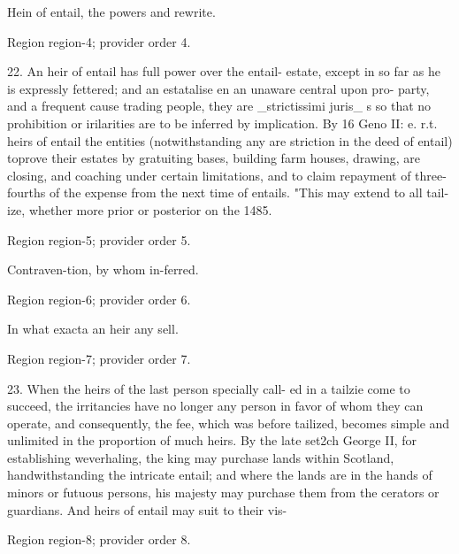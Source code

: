 \documentclass[11pt]{article}
\begin{document}
Hein of entail, the powers and rewrite.
\par

{\scriptsize\color{gray} Region region-4; provider order 4.\par}
\medskip

22. An heir of entail has full power over the entail- estate, except in so far as he is expressly fettered; and an estatalise en an unaware central upon pro- party, and a frequent cause trading people, they are \_strictissimi juris\_ s so that no prohibition or irilarities are to be inferred by implication. By 16 Geno II: e. r.t. heirs of entail the entities (notwithstanding any are striction in the deed of entail) toprove their estates by gratuiting bases, building farm houses, drawing, are closing, and coaching under certain limitations, and to claim repayment of three-fourths of the expense from the next time of entails. "This may extend to all tail-ize, whether more prior or posterior on the 1485.
\par

{\scriptsize\color{gray} Region region-5; provider order 5.\par}
\medskip

Contraven-tion, by whom in-ferred.
\par

{\scriptsize\color{gray} Region region-6; provider order 6.\par}
\medskip

In what exacta an heir any sell.
\par

{\scriptsize\color{gray} Region region-7; provider order 7.\par}
\medskip

23. When the heirs of the last person specially call- ed in a tailzie come to succeed, the irritancies have no longer any person in favor of whom they can operate, and consequently, the fee, which was before tailized, becomes simple and unlimited in the proportion of much heirs. By the late set2ch George II, for establishing weverhaling, the king may purchase lands within Scotland, handwithstanding the intricate entail; and where the lands are in the hands of minors or futuous persons, his majesty may purchase them from the cerators or guardians. And heirs of entail may suit to their vis-
\par

{\scriptsize\color{gray} Region region-8; provider order 8.\par}
\medskip
\end{document}
